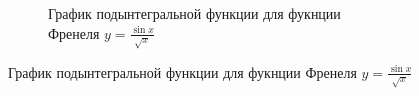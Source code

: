 \documentclass{article}
\begin{document}
\begin{figure}[H]
\begin{minipage}[t]{.4\textwidth}
\begin{figure}[H]
  \caption{График подынтегральной функции для фукнции Френеля $y =  \frac{\sin{x}}{\sqrt{x}}$}
  \label{fig:fren1_fun}
    \end{figure}
\end{minipage}
\end{figure}
\end{document}
